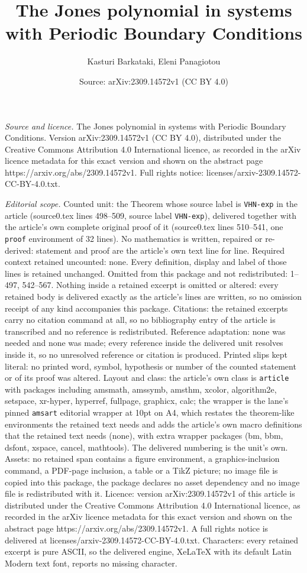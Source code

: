 \documentclass[10pt,a4paper]{amsart}
\title[The Jones polynomial in systems with Periodic Boundary Condi]{The Jones polynomial in systems with Periodic Boundary Conditions}
\author{Kasturi Barkataki, Eleni Panagiotou}
\date{Source: arXiv:2309.14572v1 (CC BY 4.0)}
\begin{document}
\maketitle

\noindent\emph{Source and licence.} The Jones polynomial in systems with Periodic Boundary Conditions. Version arXiv:2309.14572v1 (CC BY 4.0), distributed under the Creative Commons Attribution 4.0 International licence, as recorded in the arXiv licence metadata for this exact version and shown on the abstract page https://arxiv.org/abs/2309.14572v1. Full rights notice: licenses/arxiv-2309.14572-CC-BY-4.0.txt.\par\smallskip

\noindent\textit{Editorial scope.} Counted unit: the Theorem whose source label is \texttt{VHN-exp} in the article (source0.tex lines 498--509, source label \texttt{VHN-exp}), delivered together with the article's own complete original proof of it (source0.tex lines 510--541, one \texttt{proof} environment of 32 lines). No mathematics is written, repaired or re-derived: statement and proof are the article's own text line for line. Required context retained uncounted: none. Every definition, display and label of those lines is retained unchanged. Omitted from this package and not redistributed: 1--497, 542--567. Nothing inside a retained excerpt is omitted or altered: every retained body is delivered exactly as the article's lines are written, so no omission receipt of any kind accompanies this package. Citations: the retained excerpts carry no citation command at all, so no bibliography entry of the article is transcribed and no reference is redistributed. Reference adaptation: none was needed and none was made; every reference inside the delivered unit resolves inside it, so no unresolved reference or citation is produced. Printed slips kept literal: no printed word, symbol, hypothesis or number of the counted statement or of its proof was altered. Layout and class: the article's own class is \texttt{article} with packages including amsmath, amssymb, amsthm, xcolor, algorithm2e, setspace, xr-hyper, hyperref, fullpage, graphicx, calc; the wrapper is the lane's pinned \texttt{amsart} editorial wrapper at 10pt on A4, which restates the theorem-like environments the retained text needs and adds the article's own macro definitions that the retained text needs (none), with extra wrapper packages (bm, bbm, dsfont, xspace, cancel, mathtools). The delivered numbering is the unit's own. Assets: no retained span contains a figure environment, a graphics-inclusion command, a PDF-page inclusion, a table or a TikZ picture; no image file is copied into this package, the package declares no asset dependency and no image file is redistributed with it. Licence: version arXiv:2309.14572v1 of this article is distributed under the Creative Commons Attribution 4.0 International licence, as recorded in the arXiv licence metadata for this exact version and shown on the abstract page https://arxiv.org/abs/2309.14572v1. A full rights notice is delivered at licenses/arxiv-2309.14572-CC-BY-4.0.txt. Characters: every retained excerpt is pure ASCII, so the delivered engine, XeLaTeX with its default Latin Modern text font, reports no missing character.
\end{document}
